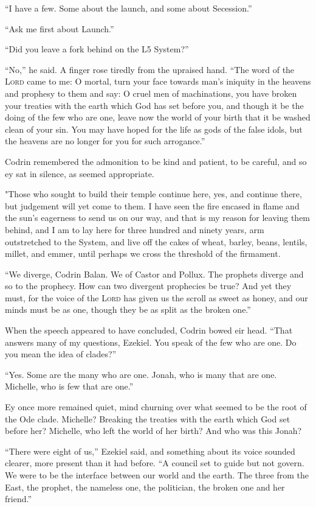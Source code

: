 ``I have a few. Some about the launch, and some about Secession.''

``Ask me first about Launch.''

``Did you leave a fork behind on the L5 System?''

``No,'' he said. A finger rose tiredly from the upraised hand. ``The word of the \textsc{Lord} came to me: O mortal, turn your face towards man's iniquity in the heavens and prophesy to them and say: O cruel men of machinations, you have broken your treaties with the earth which God has set before you, and though it be the doing of the few who are one, leave now the world of your birth that it be washed clean of your sin. You may have hoped for the life as gods of the false idols, but the heavens are no longer for you for such arrogance.''

Codrin remembered the admonition to be kind and patient, to be careful, and so ey sat in silence, as seemed appropriate.

"Those who sought to build their temple continue here, yes, and continue there, but judgement will yet come to them. I have seen the fire encased in flame and the sun's eagerness to send us on our way, and that is my reason for leaving them behind, and I am to lay here for three hundred and ninety years, arm outstretched to the System, and live off the cakes of wheat, barley, beans, lentils, millet, and emmer, until perhaps we cross the threshold of the firmament.

``We diverge, Codrin Balan. We of Castor and Pollux. The prophets diverge and so to the prophecy. How can two divergent prophecies be true? And yet they must, for the voice of the \textsc{Lord} has given us the scroll as sweet as honey, and our minds must be as one, though they be as split as the broken one.''

When the speech appeared to have concluded, Codrin bowed eir head. ``That answers many of my questions, Ezekiel. You speak of the few who are one. Do you mean the idea of clades?''

``Yes. Some are the many who are one. Jonah, who is many that are one. Michelle, who is few that are one.''

Ey once more remained quiet, mind churning over what seemed to be the root of the Ode clade. Michelle? Breaking the treaties with the earth which God set before her? Michelle, who left the world of her birth? And who was this Jonah?

``There were eight of us,'' Ezekiel said, and something about its voice sounded clearer, more present than it had before. ``A council set to guide but not govern. We were to be the interface between our world and the earth. The three from the East, the prophet, the nameless one, the politician, the broken one and her friend.''

